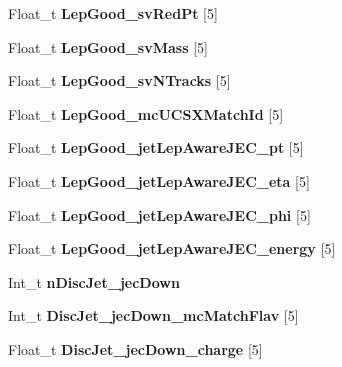\begin{DoxyCompactItemize}
Float\+\_\+t {\bfseries Lep\+Good\+\_\+sv\+Red\+Pt} \mbox{[}5\mbox{]}
\item 
\hypertarget{classMiniTree_a716da997f9c99140f093cc8a5d983d98}{}\label{classMiniTree_a716da997f9c99140f093cc8a5d983d98} 
Float\+\_\+t {\bfseries Lep\+Good\+\_\+sv\+Mass} \mbox{[}5\mbox{]}
\item 
\hypertarget{classMiniTree_a8eb71b36f894f3afc24b009de4ab7fd6}{}\label{classMiniTree_a8eb71b36f894f3afc24b009de4ab7fd6} 
Float\+\_\+t {\bfseries Lep\+Good\+\_\+sv\+N\+Tracks} \mbox{[}5\mbox{]}
\item 
\hypertarget{classMiniTree_aca55e792fc39364bb0dc31ff79dbcc98}{}\label{classMiniTree_aca55e792fc39364bb0dc31ff79dbcc98} 
Float\+\_\+t {\bfseries Lep\+Good\+\_\+mc\+U\+C\+S\+X\+Match\+Id} \mbox{[}5\mbox{]}
\item 
\hypertarget{classMiniTree_a920fe784a5e5d2dfc152529b3200e374}{}\label{classMiniTree_a920fe784a5e5d2dfc152529b3200e374} 
Float\+\_\+t {\bfseries Lep\+Good\+\_\+jet\+Lep\+Aware\+J\+E\+C\+\_\+pt} \mbox{[}5\mbox{]}
\item 
\hypertarget{classMiniTree_a9292db002b38a8bd0c32f15fac00b803}{}\label{classMiniTree_a9292db002b38a8bd0c32f15fac00b803} 
Float\+\_\+t {\bfseries Lep\+Good\+\_\+jet\+Lep\+Aware\+J\+E\+C\+\_\+eta} \mbox{[}5\mbox{]}
\item 
\hypertarget{classMiniTree_ad87b5f8c3f4c221da7cd19d1f82f24a5}{}\label{classMiniTree_ad87b5f8c3f4c221da7cd19d1f82f24a5} 
Float\+\_\+t {\bfseries Lep\+Good\+\_\+jet\+Lep\+Aware\+J\+E\+C\+\_\+phi} \mbox{[}5\mbox{]}
\item 
\hypertarget{classMiniTree_a0e6c177de25429de280b16dcf7089422}{}\label{classMiniTree_a0e6c177de25429de280b16dcf7089422} 
Float\+\_\+t {\bfseries Lep\+Good\+\_\+jet\+Lep\+Aware\+J\+E\+C\+\_\+energy} \mbox{[}5\mbox{]}
\item 
\hypertarget{classMiniTree_aaf9bd00a4d1133aba979a30e415a1882}{}\label{classMiniTree_aaf9bd00a4d1133aba979a30e415a1882} 
Int\+\_\+t {\bfseries n\+Disc\+Jet\+\_\+jec\+Down}
\item 
\hypertarget{classMiniTree_ad1414df88dadfce5fc8d829738e553c2}{}\label{classMiniTree_ad1414df88dadfce5fc8d829738e553c2} 
Int\+\_\+t {\bfseries Disc\+Jet\+\_\+jec\+Down\+\_\+mc\+Match\+Flav} \mbox{[}5\mbox{]}
\item 
\hypertarget{classMiniTree_a47b9478cb78a9cc723b19afdabfbda69}{}\label{classMiniTree_a47b9478cb78a9cc723b19afdabfbda69} 
Float\+\_\+t {\bfseries Disc\+Jet\+\_\+jec\+Down\+\_\+charge} \mbox{[}5\mbox{]}
\item 
\hypertarget{classMiniTree_ac62cfe5ecdd0535d4de242dde70ff17d}{}\label{classMiniTree_ac62cfe5ecdd0535d4de242dde70ff17d} 

\end{DoxyCompactItemize}
